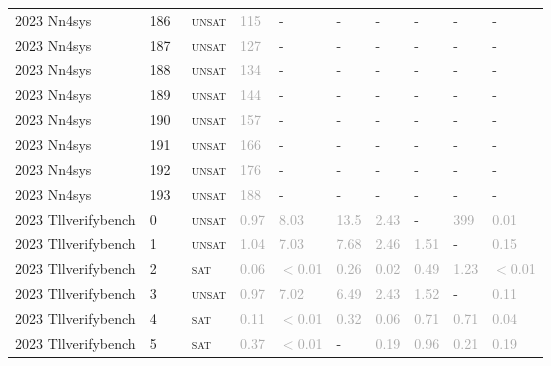 \begin{center}
{\begin{longtable}{@{}llllllllll@{}}
2023 Nn4sys & 186 & ~\textsc{unsat} & \textcolor{darkgray}{115} & - & - & - & - & - & - \\
2023 Nn4sys & 187 & ~\textsc{unsat} & \textcolor{darkgray}{127} & - & - & - & - & - & - \\
2023 Nn4sys & 188 & ~\textsc{unsat} & \textcolor{darkgray}{134} & - & - & - & - & - & - \\
2023 Nn4sys & 189 & ~\textsc{unsat} & \textcolor{darkgray}{144} & - & - & - & - & - & - \\
2023 Nn4sys & 190 & ~\textsc{unsat} & \textcolor{darkgray}{157} & - & - & - & - & - & - \\
2023 Nn4sys & 191 & ~\textsc{unsat} & \textcolor{darkgray}{166} & - & - & - & - & - & - \\
2023 Nn4sys & 192 & ~\textsc{unsat} & \textcolor{darkgray}{176} & - & - & - & - & - & - \\
2023 Nn4sys & 193 & ~\textsc{unsat} & \textcolor{darkgray}{188} & - & - & - & - & - & - \\
\midrule
2023 Tllverifybench & 0 & ~\textsc{unsat} & \textcolor{darkgray}{0.97} & \textcolor{darkgray}{8.03} & \textcolor{darkgray}{13.5} & \textcolor{darkgray}{2.43} & - & \textcolor{darkgray}{399} & \textcolor{darkgray}{0.01} \\
2023 Tllverifybench & 1 & ~\textsc{unsat} & \textcolor{darkgray}{1.04} & \textcolor{darkgray}{7.03} & \textcolor{darkgray}{7.68} & \textcolor{darkgray}{2.46} & \textcolor{darkgray}{1.51} & - & \textcolor{darkgray}{0.15} \\
2023 Tllverifybench & 2 & ~\textsc{sat} & \textcolor{darkgray}{0.06} & \textcolor{darkgray}{$<$0.01} & \textcolor{darkgray}{0.26} & \textcolor{darkgray}{0.02} & \textcolor{darkgray}{0.49} & \textcolor{darkgray}{1.23} & \textcolor{darkgray}{$<$0.01} \\
2023 Tllverifybench & 3 & ~\textsc{unsat} & \textcolor{darkgray}{0.97} & \textcolor{darkgray}{7.02} & \textcolor{darkgray}{6.49} & \textcolor{darkgray}{2.43} & \textcolor{darkgray}{1.52} & - & \textcolor{darkgray}{0.11} \\
2023 Tllverifybench & 4 & ~\textsc{sat} & \textcolor{darkgray}{0.11} & \textcolor{darkgray}{$<$0.01} & \textcolor{darkgray}{0.32} & \textcolor{darkgray}{0.06} & \textcolor{darkgray}{0.71} & \textcolor{darkgray}{0.71} & \textcolor{darkgray}{0.04} \\
2023 Tllverifybench & 5 & ~\textsc{sat} & \textcolor{darkgray}{0.37} & \textcolor{darkgray}{$<$0.01} & - & \textcolor{darkgray}{0.19} & \textcolor{darkgray}{0.96} & \textcolor{darkgray}{0.21} & \textcolor{darkgray}{0.19} \\

\end{longtable}}
\end{center}
